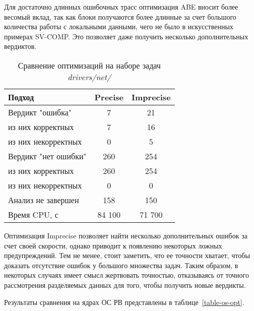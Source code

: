 Для достаточно длинных ошибочных трасс оптимизация ABE вносит более весомый вклад, так как блоки получаются более длинные за счет большого количества работы с локальными данными, чего не было в искусственных примерах SV-COMP.
Это позволяет даже получить несколько дополнительных вердиктов.


  \begin{table}[h]\footnotesize \centering
    \caption{Сравнение оптимизаций на наборе задач \textit{drivers/net/}}
  	\label{table-drivers-opt-2}
    \begin{tabular}{ | l | c | c |}
      \hline
      Подход         				& Precise	& Imprecise	  	\\ \hline
      Вердикт "ошибка" 				& 7  		& 21   			\\ 
  \hspace{0.5cm} из них корректных 	& 7 		& 16 		  	\\ 
  \hspace{0.5cm} из них некорректных & 0 		& 5 		    \\ \hline
      Вердикт "нет ошибки"  		& 260    	& 254    	    \\ 
  \hspace{0.5cm} из них корректных 	& 260 		& 254    	  	\\
  \hspace{0.5cm} из них некорректных & 0 		& 0    		   	\\ \hline
      Анализ не завершен       		& 158    	& 150    	   	\\ \hline
      Время CPU, с   				& 84 100 	& 71 700 	 	\\ 
      \hline
    \end{tabular}
  \end{table}

Оптимизация Imprecise позволяет найти несколько дополнительных ошибок за счет своей скорости, однако приводит к появлению некоторых ложных предупреждений.
Тем не менее, стоит заметить, что ее точности хватает, чтобы доказать отсутствие ошибок у большого множества задач. 
Таким образом, в некоторых случаях имеет смысл жертвовать точностью, отказываясь от точного рассмотрения разделяемых данных для того, чтобы получить новые вердикты.

Результаты сравнения на ядрах ОС РВ представлены в таблице~\ref{table-os-opt}.

